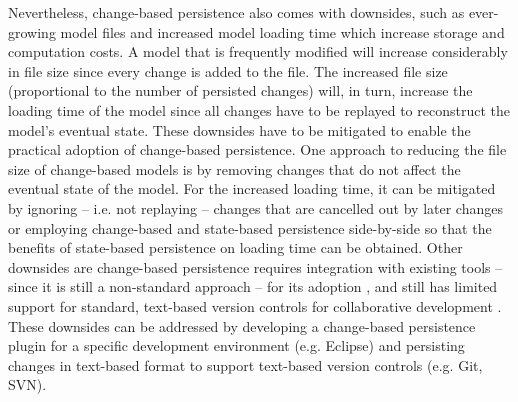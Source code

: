 \documentclass[12pt, a4paper]{report} \usepackage[titletoc]{appendix}
\begin{document}
Nevertheless, change-based persistence also comes with downsides, such as ever-growing model files \cite{DBLP:journals/entcs/RobbesL07,DBLP:conf/edoc/KoegelHLHD10} and increased model loading time \cite{mens2002state} which increase storage and computation costs. A model that is frequently modified will increase considerably in file size since every change is added to the file. The increased file size (proportional to the number of persisted changes) will, in turn, increase the loading time of the model since all changes have to be replayed to reconstruct the model's eventual state. These downsides have to be mitigated to enable the practical adoption of change-based persistence. One approach to reducing the file size of change-based models is by removing changes that do not affect the eventual state of the model. For the increased loading time, it can be mitigated by ignoring -- i.e. not replaying -- changes that are cancelled out by later changes or employing change-based and state-based persistence side-by-side so that the benefits of state-based persistence on loading time can be obtained. Other downsides are change-based persistence requires integration with existing tools -- since it is still a non-standard approach -- for its adoption \cite{koegel2010emfstore}, and still has limited support for standard, text-based version controls for collaborative development \cite{koegel2010emfstore}. These downsides can be addressed by developing a change-based persistence plugin for a specific development environment (e.g. Eclipse) and persisting changes in text-based format to support text-based version controls (e.g. Git, SVN).
\end{document}
